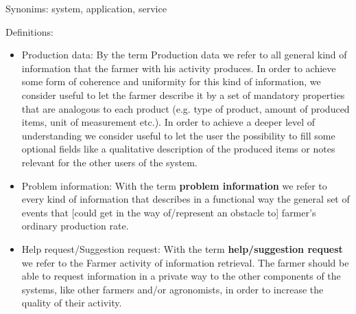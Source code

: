 Synonims: system, application, service

Definitions:
\begin{itemize}
    \item Production data: By the term Production data we refer to all general kind of information that the farmer with his activity produces. In order to achieve some form of coherence and uniformity for this kind of information, we consider useful to let the farmer describe it by a set of mandatory properties that are analogous to each product (e.g. type of product, amount of produced items, unit of measurement etc.). In order to achieve a deeper level of understanding we consider useful to let the user the possibility to fill some optional fields like a qualitative description of the produced items or notes relevant for the other users of the system.
    \item Problem information: With the term \textbf{problem information} we refer to every kind of information that describes in a functional way the general set of events that [could get in the way of/represent an obstacle to] farmer's ordinary production rate.
    \item Help request/Suggestion request: With the term \textbf{help/suggestion request} we refer to the Farmer activity of information retrieval. The farmer should be able to request information in a private way to the other components of the systems, like other farmers and/or agronomists, in order to increase the quality of their activity.

\end{itemize}

